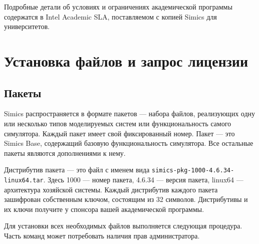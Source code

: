 Подробные детали об условиях и ограничениях академической программы содержатся в Intel Academic SLA, поставляемом с копией Simics для университетов.

\section{Установка файлов и запрос лицензии}

\subsection{Пакеты}

Simics распространяется в формате пакетов --- набора файлов, реализующих одну или несколько типов моделируемых систем или функциональность самого симулятора. Каждый пакет имеет свой фиксированный номер. Пакет  --- это Simics Base, содержащий базовую функциональность симулятора. Все остальные пакеты являются дополнениями к нему.

Дистрибутив пакета --- это файл с именем вида \texttt{simics-pkg-1000-4.6.34-linux64.tar}.  Здесь 1000 --- номер пакета, 4.6.34 --- версия пакета, linux64 --- архитектура хозяйской системы. Каждый дистрибутив каждого пакета зашифрован собственным ключом, состоящим из 32 символов. Дистрибутивы и их ключи получите у спонсора вашей академической программы.

Для установки всех необходимых файлов выполняется следующая процедура. Часть команд может потребовать наличия прав администратора.


